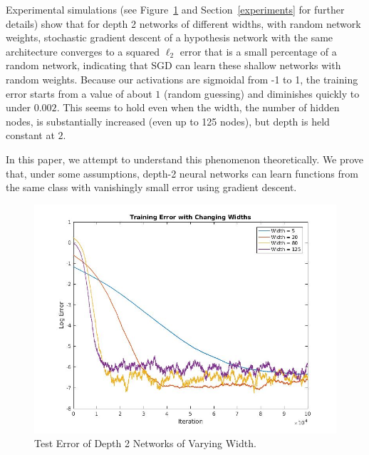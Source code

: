 Experimental simulations (see Figure~\ref{expconverge} and
Section~\ref{experiments} for further details) show that for depth 2
networks of different widths, with random network weights, stochastic
gradient descent of a hypothesis network with the same architecture
converges to a squared $\ell_2$ error that is a small percentage of a
random network, indicating that SGD can learn these shallow networks
with random weights. Because our activations are sigmoidal from -1 to
1, the training error starts from a value of about $1$ (random
guessing) and diminishes quickly to under $0.002$. This seems to hold
even when the width, the number of hidden nodes, is substantially
increased (even up to 125 nodes), but depth is held constant at $2$.

In this paper, we attempt to understand this phenomenon
theoretically. We prove that, under some assumptions, depth-2 neural
networks can learn functions from the same class with vanishingly
small error using gradient descent.

\begin{figure}[h]
\centering
\includegraphics[width = 4.5in]{plotChangeWidth.jpg}
\caption{Test Error of Depth 2 Networks of Varying Width.}
\label{expconverge}
\end{figure}




